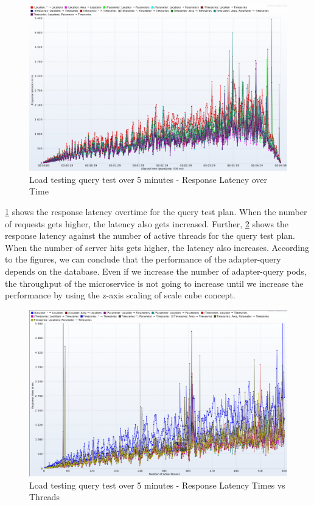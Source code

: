 \begin{figure}[htp]
    \centering
    \includegraphics[width=1.0\textwidth]{results/obs/query/obs_query_5m_latency_over_time.png}
    \caption{Load testing query test over 5 minutes - Response Latency over Time}
    \label{fi:test_obs_query_5m_response_latency}
\end{figure}
\cref{fi:test_obs_query_5m_response_latency} shows the response latency overtime for the query test plan. When the number of requests gets higher, the latency also gets increased. Further, \cref{fi:test_obs_query_5m_response_times_vs_threads} shows the response latency against the number of active threads for the query test plan. When the number of server hits gets higher, the latency also increases. According to the figures, we can conclude that the performance of the adapter-query depends on the database. Even if we increase the number of adapter-query pods, the throughput of the microservice is not going to increase until we increase the performance by using the z-axis scaling of scale cube concept.

\begin{figure}[htp]
    \centering
    \includegraphics[width=1.0\textwidth]{results/obs/query/obs_query_5m_response_times_vs_threads.png}
    \caption{Load testing query test over 5 minutes - Response Latency Times vs Threads}
    \label{fi:test_obs_query_5m_response_times_vs_threads}
\end{figure}

